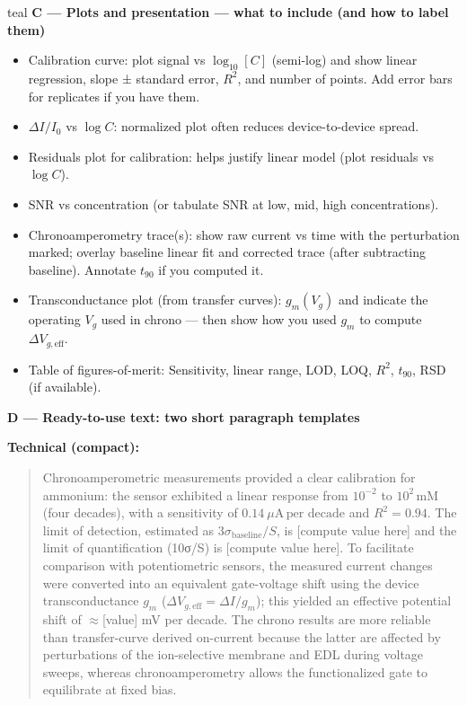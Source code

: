 \begin{color}{teal}
\noindent\textbf{C — Plots and presentation — what to include (and how to label them)}
\begin{itemize}
    \item Calibration curve: plot signal vs \(\log_{10}[C]\) (semi-log) and show linear regression, slope ± standard error, \(R^2\), and number of points. Add error bars for replicates if you have them.
    \item \(\Delta I/I_0\) vs \(\log C\): normalized plot often reduces device-to-device spread.
    \item Residuals plot for calibration: helps justify linear model (plot residuals vs \(\log C\)).
    \item SNR vs concentration (or tabulate SNR at low, mid, high concentrations).
    \item Chronoamperometry trace(s): show raw current vs time with the perturbation marked; overlay baseline linear fit and corrected trace (after subtracting baseline). Annotate \(t_{90}\) if you computed it.
    \item Transconductance plot (from transfer curves): \(g_m(V_g)\) and indicate the operating \(V_g\) used in chrono — then show how you used \(g_m\) to compute \(\Delta V_{g,\text{eff}}\).
    \item Table of figures-of-merit: Sensitivity, linear range, LOD, LOQ, \(R^2\), \(t_{90}\), RSD (if available).
\end{itemize}

\bigskip

\noindent\textbf{D — Ready-to-use text: two short paragraph templates}

\textbf{Technical (compact):}
\begin{quote}
Chronoamperometric measurements provided a clear calibration for ammonium: the sensor exhibited a linear response from \(10^{-2}\) to \(10^{2}\,\text{mM}\) (four decades), with a sensitivity of \(0.14\ \mu\text{A}\,\text{per decade}\) and \(R^{2}=0.94\). The limit of detection, estimated as \(3\sigma_{\text{baseline}}/S\), is [compute value here] and the limit of quantification (10σ/S) is [compute value here]. To facilitate comparison with potentiometric sensors, the measured current changes were converted into an equivalent gate-voltage shift using the device transconductance \(g_m\) (\(\Delta V_{g,\text{eff}}=\Delta I/g_m\)); this yielded an effective potential shift of $\approx$[value] mV per decade. The chrono results are more reliable than transfer-curve derived on-current because the latter are affected by perturbations of the ion-selective membrane and EDL during voltage sweeps, whereas chronoamperometry allows the functionalized gate to equilibrate at fixed bias.
\end{quote}


\end{color}

